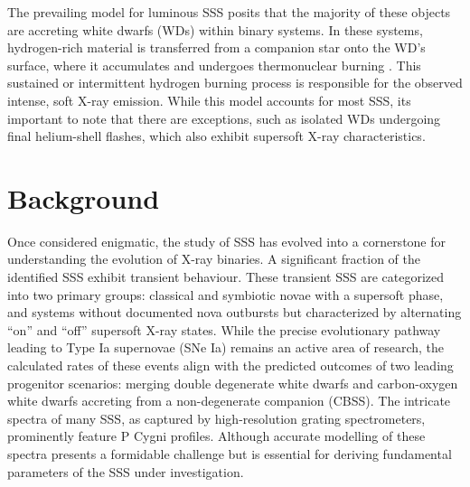         	The prevailing model for luminous SSS posits that the majority of these objects are accreting white dwarfs (WDs) within binary systems. In these systems, hydrogen-rich material is transferred from a companion star onto the WD's surface, where it accumulates and undergoes thermonuclear burning \cite{van1992accreting}. This sustained or intermittent hydrogen burning process is responsible for the observed intense, soft X-ray emission. While this model accounts for most SSS, its important to note that there are exceptions, such as isolated WDs undergoing final helium-shell flashes, which also exhibit supersoft X-ray characteristics.
    
    \section{Background} \label{introduction:background}
    	Once considered enigmatic, the study of SSS has evolved into a cornerstone for understanding the evolution of X-ray binaries. A significant fraction of the identified SSS exhibit transient behaviour. These transient SSS are categorized into two primary groups: classical and symbiotic novae with a supersoft phase, and systems without documented nova outbursts but characterized by alternating ``on'' and ``off'' supersoft X-ray states. While the precise evolutionary pathway leading to Type Ia supernovae (SNe Ia) remains an active area of research, the calculated rates of these events align with the predicted outcomes of two leading progenitor scenarios: merging double degenerate white dwarfs and carbon-oxygen white dwarfs accreting from a non-degenerate companion (CBSS). The intricate spectra of many SSS, as captured by high-resolution grating spectrometers, prominently feature P Cygni profiles. Although accurate modelling of these spectra presents a formidable challenge but is essential for deriving fundamental parameters of the SSS under investigation.
    

